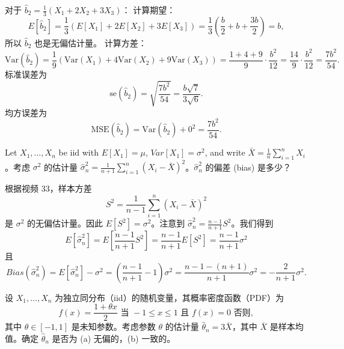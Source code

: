 \begin{questions}
\begin{solution}
对于 $\hat{b}_2 = \frac{1}{3}(X_1 + 2X_2 + 3X_3)$：
计算期望：
\[
E[\hat{b}_2] = \frac{1}{3}(E[X_1] + 2E[X_2] + 3E[X_3]) = \frac{1}{3}\left(\frac{b}{2} + b + \frac{3b}{2}\right) = b,
\]
所以 $\hat{b}_2$ 也是无偏估计量。
计算方差：
\[
\text{Var}(\hat{b}_2) = \frac{1}{9}(\text{Var}(X_1) + 4\text{Var}(X_2) + 9\text{Var}(X_3)) = \frac{1+4+9}{9} \cdot \frac{b^2}{12} = \frac{14}{9} \cdot \frac{b^2}{12} = \frac{7b^2}{54}.
\]
标准误差为
\[
\text{se}(\hat{b}_2) = \sqrt{\frac{7b^2}{54}} = \frac{b\sqrt{7}}{3\sqrt{6}}.
\]
均方误差为
\[
\text{MSE}(\hat{b}_2) = \text{Var}(\hat{b}_2) + 0^2 = \frac{7b^2}{54}.
\]
\end{solution}

\question Let $X_1, \dots, X_n$ be iid with $E[X_1] = \mu$, $Var[X_1] = \sigma^2$, and write $\bar{X} = \frac{1}{n} \sum_{i=1}^n X_i$。考虑 $\sigma^2$ 的估计量 $\hat{\sigma}_n^2 = \frac{1}{n+1} \sum_{i=1}^n (X_i - \bar{X})^2$。$\hat{\sigma}_n^2$ 的偏差 (bias) 是多少？

\begin{solution}
根据视频 33，样本方差
\[
S^2 = \frac{1}{n-1} \sum_{i=1}^n (X_i - \bar{X})^2
\]
是 $\sigma^2$ 的无偏估计量。因此 $E[S^2] = \sigma^2$。注意到 $\hat{\sigma}_n^2 = \frac{n-1}{n+1} S^2$。我们得到
\[
E[\hat{\sigma}_n^2] = E\left[\frac{n-1}{n+1} S^2\right] = \frac{n-1}{n+1} E[S^2] = \frac{n-1}{n+1} \sigma^2
\]
且
\[
Bias(\hat{\sigma}_n^2) = E[\hat{\sigma}_n^2] - \sigma^2 = \left(\frac{n-1}{n+1} - 1\right) \sigma^2 = \frac{n-1 - (n+1)}{n+1} \sigma^2 = -\frac{2}{n+1} \sigma^2.
\]
\end{solution}

\question
设 $X_1, \dots, X_n$ 为独立同分布（iid）的随机变量，其概率密度函数（PDF）为
\[
f(x) = \frac{1 + \theta x}{2} \text{ 当 } -1 \le x \le 1 \text{ 且 } f(x) = 0 \text{ 否则},
\]
其中 $\theta \in [-1, 1]$ 是未知参数。考虑参数 $\theta$ 的估计量 $\hat{\theta}_n = 3\bar{X}$，其中 $\bar{X}$ 是样本均值。确定 $\hat{\theta}_n$ 是否为 (a) 无偏的，(b) 一致的。


\end{questions}
